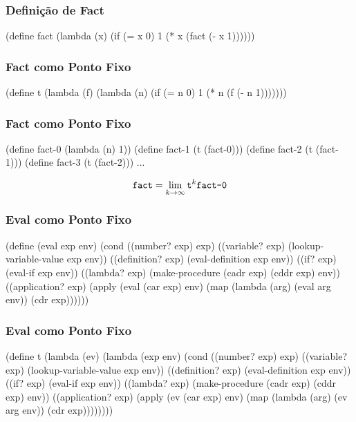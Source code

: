 \begin{frame}[fragile]
  \frametitle{Definição de Fact}
  \begin{code}
  (define fact
    (lambda (x)
      (if (= x 0)
          1
          (* x (fact (- x 1))))))
  \end{code}
\end{frame}

\begin{frame}[fragile]
  \frametitle{Fact como Ponto Fixo}
  \begin{code}
(define t
  (lambda (f)
    (lambda (n)
      (if (= n 0)
          1
          (* n (f (- n 1)))))))
  \end{code}
\end{frame}

\begin{frame}[fragile]
  \frametitle{Fact como Ponto Fixo}
  \begin{code}
  (define fact-0 (lambda (n) 1))
  (define fact-1 (t (fact-0)))
  (define fact-2 (t (fact-1)))
  (define fact-3 (t (fact-2)))
  ...
  \end{code}

  \pause

  \[\texttt{fact} = \lim_{k \to \infty} \texttt{t}^k \texttt{fact-0}\]
\end{frame}

\begin{frame}[fragile]
  \frametitle{Eval como Ponto Fixo}
  \begin{code}
(define (eval exp env)
  (cond
    ((number? exp)      exp)
    ((variable? exp)    (lookup-variable-value exp env))
    ((definition? exp)  (eval-definition exp env))
    ((if? exp)          (eval-if exp env))
    ((lambda? exp)      (make-procedure (cadr exp)
                                        (cddr exp) env))
    ((application? exp) (apply (eval (car exp) env)
                               (map (lambda (arg)
                                            (eval arg env))
                                    (cdr exp))))))
  \end{code}
\end{frame}

\begin{frame}[fragile]
  \frametitle{Eval como Ponto Fixo}
  \begin{code}
(define t (lambda (ev) (lambda (exp env)
  (cond
    ((number? exp)      exp)
    ((variable? exp)    (lookup-variable-value exp env))
    ((definition? exp)  (eval-definition exp env))
    ((if? exp)          (eval-if exp env))
    ((lambda? exp)      (make-procedure (cadr exp)
                                        (cddr exp) env))
    ((application? exp) (apply (ev (car exp) env)
                               (map (lambda (arg)
                                            (ev arg env))
                                    (cdr exp))))))))
  \end{code}
\end{frame}

